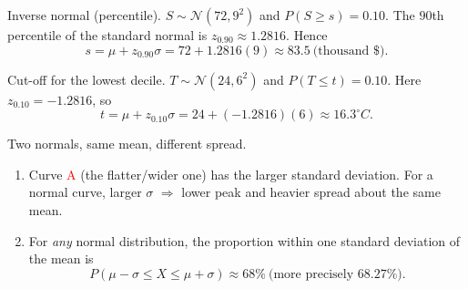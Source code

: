 \documentclass[11pt]{article}
\def\textbf#1{#1}%
\def\mathrm#1{#1}%
\begin{document}
\begin{solution}
\textbf{Inverse normal (percentile).} $S\sim\mathcal N(72,9^2)$ and $P(S\ge s)=0.10$.
The $90$th percentile of the standard normal is $z_{0.90}\approx 1.2816$. Hence
\[
s=\mu+z_{0.90}\sigma = 72 + 1.2816(9) \approx \boxed{83.5}\ \text{(thousand \$)}.
\]

\begin{center}
\end{center}
\end{solution}

\begin{solution}
\textbf{Cut-off for the lowest decile.} $T\sim\mathcal N(24,6^2)$ and $P(T\le t)=0.10$.
Here $z_{0.10}=-1.2816$, so
\[
t=\mu+z_{0.10}\sigma = 24 + (-1.2816)(6) \approx \boxed{16.3^\circ\mathrm{C}}.
\]

\begin{center}
\end{center}
\end{solution}

\begin{solution}
\textbf{Two normals, same mean, different spread.}
\begin{enumerate}
  \item Curve \textcolor{red}{A} (the flatter/wider one) has the larger standard deviation. For a normal curve, larger $\sigma$ $\Rightarrow$ lower peak and heavier spread about the same mean.
  \item For \emph{any} normal distribution, the proportion within one standard deviation of the mean is
  \[
  P(\mu-\sigma\le X\le\mu+\sigma)\approx \boxed{68\%\ \text{(more precisely }68.27\%\text{)}}.
  \]
\end{enumerate}
\end{solution}
\end{document}
